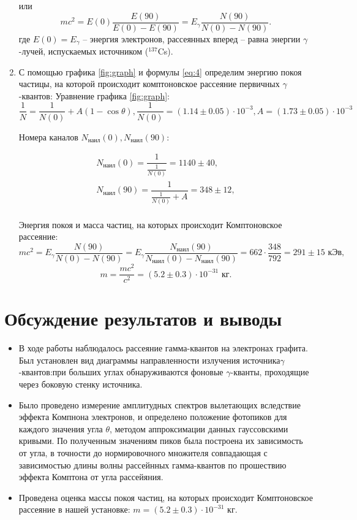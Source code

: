 \documentclass[a4paper,12pt]{article}
\begin{document}
\begin{enumerate}
	или
	\begin{equation}
		mc^2=E(0)\frac{E(90)}{E(0)-E(90)}=E_\gamma\frac{N(90)}{N(0)-N(90)}.
		\label{eq:4}
	\end{equation}
	где $E(0)=E_\gamma$ -- энергия электронов, рассеянных вперед -- равна энергии $\gamma$-лучей, испускаемых источником ($^{137}$Cs).\par
	\item С помощью графика \ref{fig:graph} и формулы \ref{eq:4} определим энергию покоя частицы, на которой происходит комптоновское рассеяние первичных $\gamma$-квантов:
Уравнение графика \ref{fig:graph}:
\[\frac{1}{N}=\frac{1}{N(0)} + A(1-\cos\theta),    \frac{1}{N(0)} = (1.14 \pm 0.05) \cdot 10^{-3},     A = (1.73 \pm 0.05) \cdot 10^{-3} \]

Номера каналов $N_{\text{наил}}(0), N_{\text{наил}}(90)$:

\[\begin{array}{l}
N_{\text{наил}}(0) = \dfrac{1}{\frac{1}{N(0)}} = 1140 \pm 40,\\[12pt]
N_{\text{наил}}(90) = \dfrac{1}{\frac{1}{N(0)}+A} = 348 \pm 12,\\
\end{array}
\]


Энергия покоя и масса частиц, на которых происходит Комптоновское рассеяние:
\[
mc^2=E_\gamma\frac{N(90)}{N(0)-N(90)} =E_\gamma\frac{N_{\text{наил}}(90)}{N_{\text{наил}}(0)-N_{\text{наил}}(90)} = 662 \cdot \frac{348}{792} = 291 \pm 15 \text{ кЭв},
\]
\[m = \frac{mc^2}{c^2} = (5.2 \pm 0.3)\cdot 10^{-31} \text{ кг} .\]

\end{enumerate}
\section{Обсуждение результатов и выводы}
\begin{itemize}
    \item В ходе работы наблюдалось рассеяние гамма-квантов на электронах графита. Был установлен вид диаграммы направленности излучения источника$\gamma$-квантов:при больших углах обнаруживаются фоновые $\gamma$-кванты, проходящие через боковую стенку источника.
    \item Было проведено измерение амплитудных спектров вылетающих вследствие эффекта Компнона электронов, и определено положение фотопиков для каждого значения угла $\theta$, методом аппроксимации данных гауссовскими кривыми. По полученным значениям пиков была построена их зависимость  от угла, в точности до нормировочного множителя совпадающая с зависимостью длины волны рассейнных гамма-квантов по прошествию эффекта Комптона от угла рассейяния.
    \item  Проведена оценка массы покоя частиц, на которых происходит Комптоновское рассеяние в нашей установке: $m =  (5.2 \pm 0.3)\cdot 10^{-31} \text{ кг}$.
    

    
\end{itemize}
\end{document}
